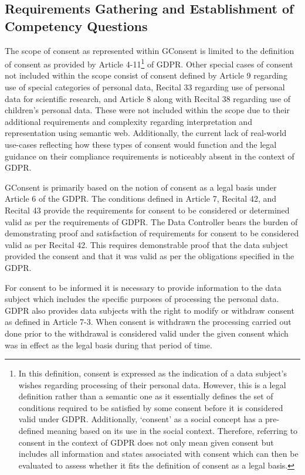 \subsection{Requirements Gathering and Establishment of Competency Questions}
The scope of consent as represented within GConsent is limited to the definition of consent as provided by Article 4-11\footnote{In this definition, consent is expressed as the indication of a data subject's wishes regarding processing of their personal data. However, this is a legal definition rather than a semantic one as it essentially defines the set of conditions required to be satisfied by some consent before it is considered valid under GDPR. Additionally, `consent' as a social concept has a pre-defined meaning based on its use in the social context. Therefore, referring to consent in the context of GDPR does not only mean given consent but includes all information and states associated with consent which can then be evaluated to assess whether it fits the definition of consent as a legal basis.} of GDPR. 
Other special cases of consent not included within the scope consist of consent defined by Article 9 regarding use of special categories of personal data, Recital 33 regarding use of personal data for scientific research, and Article 8 along with Recital 38 regarding use of children’s personal data.
These were not included within the scope due to their additional requirements and complexity regarding interpretation and representation using semantic web. Additionally, the current lack of real-world use-cases reflecting how these types of consent would function and the legal guidance on their compliance requirements is noticeably absent in the context of GDPR.

GConsent is primarily based on the notion of consent as a legal basis under Article 6 of the GDPR. The conditions defined in Article 7, Recital 42, and Recital 43 provide the requirements for consent to be considered or determined valid as per the requirements of GDPR.
The Data Controller bears the burden of demonstrating proof and satisfaction of requirements for consent to be considered valid as per Recital 42. This requires demonstrable proof that the data subject provided the consent and that it was valid as per the obligations specified in the GDPR.

For consent to be informed it is necessary to provide information to the data subject which includes the specific purposes of processing the personal data.
GDPR also provides data subjects with the right to modify or withdraw consent as defined in Article 7-3.
When consent is withdrawn the processing carried out done prior to the withdrawal is considered valid under the given consent which was in effect as the legal basis during that period of time.

